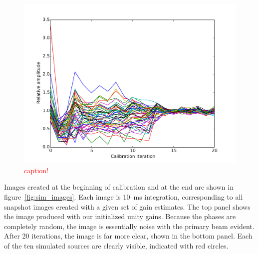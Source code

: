 \documentclass[a4paper,fleqn,usenatbib]{../mnras}
\begin{document}
\begin{figure}
\begin{center}
\includegraphics[width=\columnwidth]{figures/cal_paper_sim_amps.pdf}
\caption{\textcolor{red}{caption!}}
\label{fig:sim_amp}
\end{center}
\end{figure}

Images created at the beginning of calibration and at the end are shown in figure~\ref{fig:sim_images}. Each image is 10~ms integration, corresponding to all snapshot images created with a given set of gain estimates. The top panel shows the image produced with our initialized unity gains. Because the phases are completely random, the image is essentially noise with the primary beam evident. After 20 iterations, the image is far more clear, shown in the bottom panel. Each of the ten simulated sources are clearly visible, indicated with red circles. 
\end{document}
